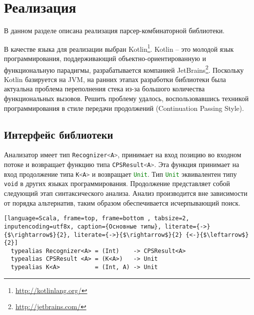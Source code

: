 \section{Реализация}

В данном разделе описана реализация парсер-комбинаторной библиотеки.

В качестве языка для реализации выбран Kotlin\footnote{\url{http://kotlinlang.org/}}. Kotlin -- это молодой язык программирования, поддерживающий объектно-ориентированную и функциональную парадигмы, разрабатывается компанией JetBrains\footnote{\url{http://jetbrains.com/}}. Поскольку Kotlin базируется на JVM, на ранних этапах разработки библиотеки была актуальна проблема переполнения стека из-за большого количества функциональных вызовов. Решить проблему удалось, воспользовавшись техникой программирования в стиле передачи продолжений (Continuation Passing Style).
  
    \subsection{Интерфейс библиотеки}
  
Анализатор имеет тип \lstinline[language=Scala]{Recognizer<A>}, принимает на вход позицию во входном потоке и возвращает функцию типа \lstinline[language=Scala]{CPSResult<A>}. Эта функция принимает на вход продолжение типа \lstinline[language=Scala]{K<A>} и возвращает \lstinline[language=Scala]{Unit}. Тип \lstinline[language=Scala]{Unit} эквивалентен типу {\tt void} в других языках программирования. Продолжение представляет собой следующий этап синтаксического анализа. Анализ производится вне зависимости от порядка
    альтернатив, таким образом обеспечивается исчерпывающий поиск. 
    
  \begin{lstlisting}[language=Scala, frame=top, frame=bottom , tabsize=2, inputencoding=utf8x, caption={Основные типы}, literate={->}{$\rightarrow$}{2}, literate={->}{$\rightarrow$}{2} {<-}{$\leftarrow$}{2}]
  typealias Recognizer<A> = (Int)    -> CPSResult<A> 
  typealias CPSResult <A> = (K<A>)   -> Unit
  typealias K<A>          = (Int, A) -> Unit
  \end{lstlisting}
  
